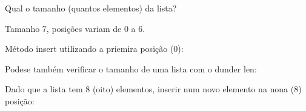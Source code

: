 \documentclass[letterpaper,10pt,brazil]{sphinxmanual}
\begin{document}
Qual o tamanho (quantos elementos) da lista?

\begin{sphinxVerbatim}[commandchars=\\\{\}]
\end{sphinxVerbatim}

\begin{sphinxVerbatim}[commandchars=\\\{\}]
\end{sphinxVerbatim}

Tamanho 7, posições variam de 0 a 6.

Método insert utilizando a priemira posição (0):

\begin{sphinxVerbatim}[commandchars=\\\{\}]
 
\end{sphinxVerbatim}

\begin{sphinxVerbatim}[commandchars=\\\{\}]
\end{sphinxVerbatim}

Pode\sphinxhyphen{}se também verificar o tamanho de uma lista com o dunder len:

\begin{sphinxVerbatim}[commandchars=\\\{\}]
\end{sphinxVerbatim}

\begin{sphinxVerbatim}[commandchars=\\\{\}]
\end{sphinxVerbatim}

Dado que a lista tem 8 (oito) elementos, inserir num novo elemento na nona (8) posição:

\begin{sphinxVerbatim}[commandchars=\\\{\}]
 
\end{sphinxVerbatim}
\end{document}
